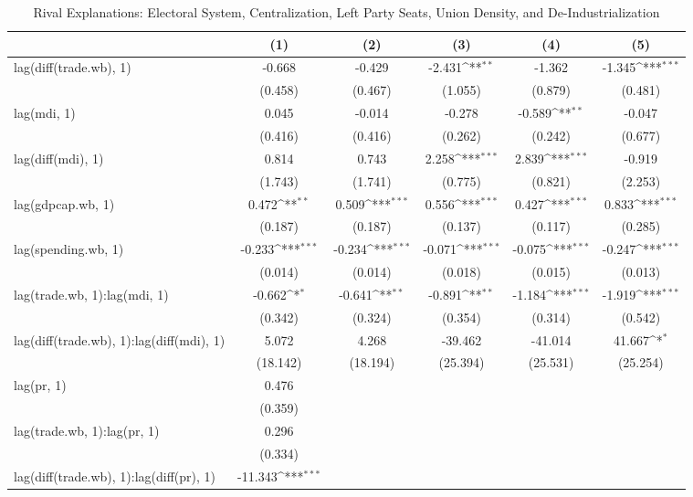 \def\sym#1{\ifmmode^{#1}\else\(^{#1}\)\fi}
\begin{table}[htbp]
\scriptsize
\caption{Rival Explanations: Electoral System, Centralization, Left Party Seats, Union Density, and De-Industrialization}
\begin{tabular}{l*{5}{c}}
\hline\hline
  &\multicolumn{1}{c}{(1)} &\multicolumn{1}{c}{(2)} &\multicolumn{1}{c}{(3)} &\multicolumn{1}{c}{(4)} &\multicolumn{1}{c}{(5)} \\
\hline
lag(diff(trade.wb), 1) 		&-0.668 		&-0.429 		&-2.431\sym{**} 		&-1.362 		&-1.345\sym{***} \\
  		&(0.458) 		&(0.467) 		&(1.055) 		&(0.879) 		&(0.481) \\
lag(mdi, 1) 		&0.045 		&-0.014 		&-0.278 		&-0.589\sym{**} 		&-0.047 \\
  		&(0.416) 		&(0.416) 		&(0.262) 		&(0.242) 		&(0.677) \\
lag(diff(mdi), 1) 		&0.814 		&0.743 		&2.258\sym{***} 		&2.839\sym{***} 		&-0.919 \\
  		&(1.743) 		&(1.741) 		&(0.775) 		&(0.821) 		&(2.253) \\
lag(gdpcap.wb, 1) 		&0.472\sym{**} 		&0.509\sym{***} 		&0.556\sym{***} 		&0.427\sym{***} 		&0.833\sym{***} \\
  		&(0.187) 		&(0.187) 		&(0.137) 		&(0.117) 		&(0.285) \\
lag(spending.wb, 1) 		&-0.233\sym{***} 		&-0.234\sym{***} 		&-0.071\sym{***} 		&-0.075\sym{***} 		&-0.247\sym{***} \\
  		&(0.014) 		&(0.014) 		&(0.018) 		&(0.015) 		&(0.013) \\
lag(trade.wb, 1):lag(mdi, 1) 		&-0.662\sym{*} 		&-0.641\sym{**} 		&-0.891\sym{**} 		&-1.184\sym{***} 		&-1.919\sym{***} \\
  		&(0.342) 		&(0.324) 		&(0.354) 		&(0.314) 		&(0.542) \\
lag(diff(trade.wb), 1):lag(diff(mdi), 1) 		&5.072 		&4.268 		&-39.462 		&-41.014 		&41.667\sym{*} \\
  		&(18.142) 		&(18.194) 		&(25.394) 		&(25.531) 		&(25.254) \\
lag(pr, 1) 		&0.476 		& 		& 		& 		& \\
  		&(0.359) 		& 		& 		& 		& \\
lag(trade.wb, 1):lag(pr, 1) 		&0.296 		& 		& 		& 		& \\
  		&(0.334) 		& 		& 		& 		& \\
lag(diff(trade.wb), 1):lag(diff(pr), 1) 		&-11.343\sym{***} 		& 		& 		& 		& \\

\end{tabular}
\end{table}
